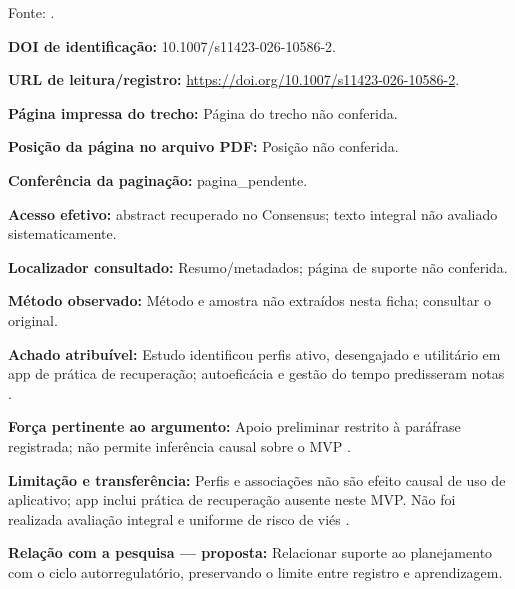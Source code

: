 Fonte: \citet{education_wong2026}.

\noindent\textbf{DOI de identificação:} 10.1007/s11423-026-10586-2.\par\medskip

\noindent\textbf{URL de leitura/registro:} \url{https://doi.org/10.1007/s11423-026-10586-2}.\par\medskip

\noindent\textbf{Página impressa do trecho:} Página do trecho não conferida.\par\medskip

\noindent\textbf{Posição da página no arquivo PDF:} Posição não conferida.\par\medskip

\noindent\textbf{Conferência da paginação:} pagina\_pendente.\par\medskip

\noindent\textbf{Acesso efetivo:} abstract recuperado no Consensus; texto integral não avaliado sistematicamente.\par\medskip

\noindent\textbf{Localizador consultado:} Resumo/metadados; página de suporte não conferida.\par\medskip

\noindent\textbf{Método observado:} Método e amostra não extraídos nesta ficha; consultar o original.\par\medskip

\noindent\textbf{Achado atribuível:} Estudo identificou perfis ativo, desengajado e utilitário em app de prática de recuperação; autoeficácia e gestão do tempo predisseram notas \citep{education_wong2026}.\par\medskip

\noindent\textbf{Força pertinente ao argumento:} Apoio preliminar restrito à paráfrase registrada; não permite inferência causal sobre o MVP \citep{education_wong2026}.\par\medskip

\noindent\textbf{Limitação e transferência:} Perfis e associações não são efeito causal de uso de aplicativo; app inclui prática de recuperação ausente neste MVP. Não foi realizada avaliação integral e uniforme de risco de viés \citep{education_wong2026}.\par\medskip

\noindent\textbf{Relação com a pesquisa — proposta:} Relacionar suporte ao planejamento com o ciclo autorregulatório, preservando o limite entre registro e aprendizagem.\par\medskip


